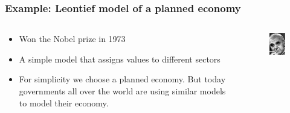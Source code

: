 \begin{frame}
	\frametitle{Example: Leontief model of a planned economy}
	\begin{columns}
		\begin{column}{0.6 \textwidth}
			\begin{itemize}
					\item Won the Nobel prize in 1973
					\item A simple model that assigns values to different sectors
					\item For simplicity we choose a planned economy. But today governments all over the world are using similar models to model their economy.
			\end{itemize}
		\end{column}
		\begin{column}{0.4 \textwidth}
			
		\begin{figure}
			\centering
			\includegraphics[width=0.8\linewidth]{Images/discrete_time_systems_10}	
			\end{figure}
		\end{column}
	\end{columns}

\end{frame}
